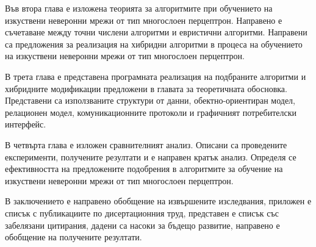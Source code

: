 Във втора глава е изложена теорията за алгоритмите при обучението на изкуствени неверонни мрежи от тип многослоен перцептрон. Направено е съчетаване между точни числени алгоритми и евристични алгоритми. Направени са предложения за реализация на хибридни алгоритми в процеса на обучението на изкуствени неверонни мрежи от тип многослоен перцептрон. 

В трета глава е представена програмната реализация на подбраните алгоритми и хибридните модификации предложени в главата за теоретичната обосновка. Представени са използваните структури от данни, обектно-ориентиран модел, релационен модел, комуникационните протоколи и графичният потребителски интерфейс. 

В четвърта глава е изложен сравнителният анализ. Описани са проведените експерименти, получените резултати и е направен кратък анализ. Определя се ефективността на предложените подобрения в алгоритмите за обучение на изкуствени неверонни мрежи от тип многослоен перцептрон.

В заключението е направено обобщение на извършените изследвания, приложен е списък с публикациите по дисертационния труд, представен е списък със забелязани цитирания, дадени са насоки за бъдещо развитие, направено е обобщение на получените резултати.


